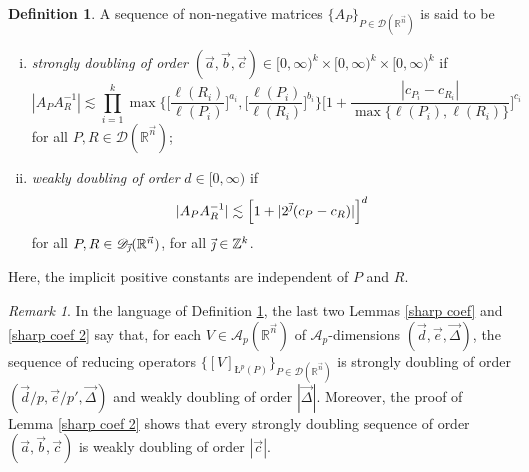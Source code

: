 \documentclass[11pt, reqno]{amsart}
\theoremstyle{definition}
\newtheorem{definition}[theorem]{Definition}
\theoremstyle{remark}
\newtheorem{remark}[theorem]{Remark}
\numberwithin{equation}{section}
\newcommand{\A}{\mathscr A}
\newcommand{\D}{\mathscr D}
\newcommand{\R}{\mathbb R}
\newcommand{\Z}{\mathbb Z}
\newcommand{\va}{\vec a}
\newcommand{\vb}{\vec b}
\newcommand{\vc}{\vec c}
\newcommand{\vd}{\vec d}
\newcommand{\vDe}{\vec{\Delta}}
\newcommand{\ve}{\vec e}
\newcommand{\vj}{\vec{\textit{\j}}}
\newcommand{\vn}{\vec n}
\newcommand{\aveL}{\textit{\L}}
\newcommand{\abs}[1]{|#1|}
\begin{document}
\begin{definition}\label{doubling}
A sequence of non-negative matrices $\{A_P\}_{P\in\D(\R^{\vn})}$ is said to be
\begin{enumerate}[(i)]
\item \emph{strongly doubling of order} $(\va,\vb,\vc)\in[0,\infty)^k\times[0,\infty)^k\times[0,\infty)^k$ if
\begin{equation*}
\abs{A_P A_R^{-1}}
\lesssim
\prod_{i=1}^k\max \bigg\{\bigg[\frac{\ell(R_i)}{\ell(P_i)}\bigg]^{a_i},
\bigg[\frac{\ell(P_i)}{\ell(R_i)}\bigg]^{b_i}\bigg\}
\bigg[ 1+\frac{\abs{c_{P_i}-c_{R_i}}}{\max\{\ell(P_i),\ell(R_i)\}}\bigg]^{c_i}
\end{equation*}
for all $P,R\in\D(\R^{\vn})$;

\item \emph{weakly doubling of order} $d\in[0,\infty)$ if
\begin{equation*}
\abs{A_P A_R^{-1}}
\lesssim\Big[1+\abs{2^{\vj}(c_P-c_R)}\Big]^{d}
\end{equation*}
for all $P,R\in\D_{\vj}(\R^{\vn})$, for all $\vj\in\Z^k$.
\end{enumerate}
Here, the implicit positive constants are independent of $P$ and $R$.
\end{definition}

\begin{remark}\label{Ap doubling}
In the language of Definition \ref{doubling}, the last two Lemmas \ref{sharp coef} and \ref{sharp coef 2} say that, for each $V\in\A_p(\R^{\vn})$ of $\A_p$-dimensions $(\vd,\ve,\vDe)$, the sequence of reducing operators $\{[V]_{\aveL^p(P)}\}_{P\in\D(\R^{\vn})}$ is strongly doubling of order $(\vd/p,\ve/p',\vDe)$ and weakly doubling of order $\abs{\vDe}$. Moreover, the proof of Lemma \ref{sharp coef 2} shows that every strongly doubling sequence of order $(\va,\vb,\vc)$ is weakly doubling of order $\abs{\vc}$.
\end{remark}
\end{document}
